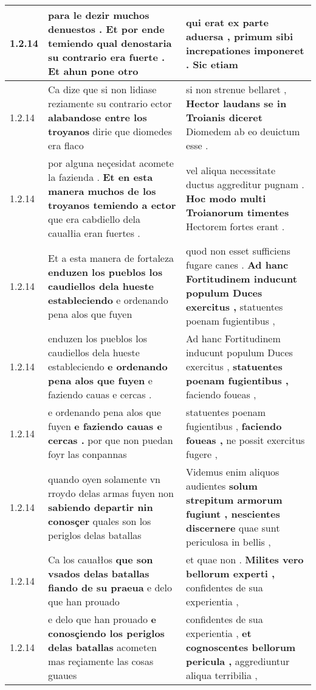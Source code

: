 \begin{tabular}{|p{1cm}|p{6.5cm}|p{6.5cm}|}
1.2.14 & para le dezir muchos denuestos . \textbf{ Et por ende temiendo qual denostaria su contrario era fuerte . } Et ahun pone otro & qui erat ex parte aduersa , \textbf{ primum sibi increpationes imponeret . } Sic etiam \\\hline
1.2.14 & Ca dize que si non lidiase reziamente su contrario ector \textbf{ alabandose entre los troyanos } dirie que diomedes era flaco & si non strenue bellaret , \textbf{ Hector laudans se in Troianis diceret } Diomedem ab eo deuictum esse . \\\hline
1.2.14 & por alguna neçesidat acomete la fazienda . \textbf{ Et en esta manera muchos de los troyanos temiendo a ector } que era cabdiello dela caualłia eran fuertes . & vel aliqua necessitate ductus aggreditur pugnam . \textbf{ Hoc modo multi Troianorum timentes } Hectorem fortes erant . \\\hline
1.2.14 & Et a esta manera de fortaleza \textbf{ enduzen los pueblos los caudiellos dela hueste estableciendo } e ordenando pena alos que fuyen & quod non esset sufficiens fugare canes . \textbf{ Ad hanc Fortitudinem inducunt populum Duces exercitus , } statuentes poenam fugientibus , \\\hline
1.2.14 & enduzen los pueblos los caudiellos dela hueste estableciendo \textbf{ e ordenando pena alos que fuyen } e faziendo cauas e cercas . & Ad hanc Fortitudinem inducunt populum Duces exercitus , \textbf{ statuentes poenam fugientibus , } faciendo foueas , \\\hline
1.2.14 & e ordenando pena alos que fuyen \textbf{ e faziendo cauas e cercas . } por que non puedan foyr las conpannas & statuentes poenam fugientibus , \textbf{ faciendo foueas , } ne possit exercitus fugere , \\\hline
1.2.14 & quando oyen solamente vn rroydo delas armas fuyen non \textbf{ sabiendo departir nin conosçer } quales son los periglos delas batallas & Videmus enim aliquos audientes \textbf{ solum strepitum armorum fugiunt , nescientes discernere } quae sunt periculosa in bellis , \\\hline
1.2.14 & Ca los cauałłos \textbf{ que son vsados delas batallas fiando de su praeua } e delo que han prouado & et quae non . \textbf{ Milites vero bellorum experti , } confidentes de sua experientia , \\\hline
1.2.14 & e delo que han prouado \textbf{ e conosçiendo los periglos delas batallas } acometen mas reçiamente las cosas guaues & confidentes de sua experientia , \textbf{ et cognoscentes bellorum pericula , } aggrediuntur aliqua terribilia , \\\hline

\end{tabular}
